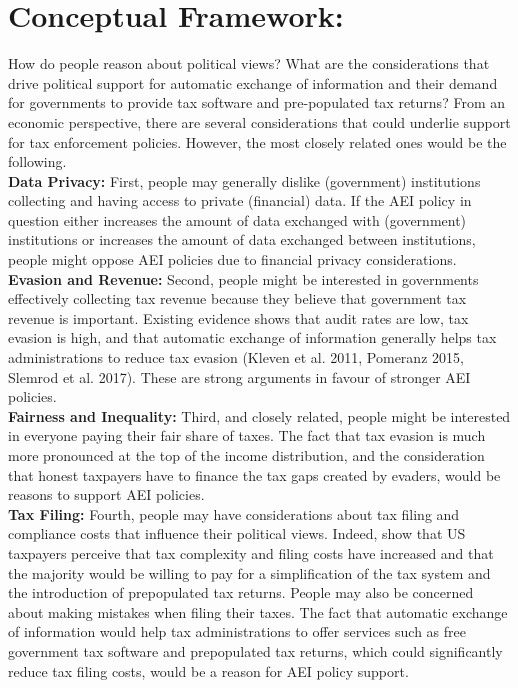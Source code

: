 \documentclass[11pt]{article}
\begin{document}
\section{Conceptual Framework:} How do people reason about political views? What are the considerations that drive political support for automatic exchange of information and their demand for governments to provide tax software and pre-populated tax returns? From an economic perspective, there are several considerations that could underlie support for tax enforcement policies. However, the most closely related ones would be the following. \\[0.5em]
\textbf{Data Privacy:} First, people may generally dislike (government) institutions collecting and having access to private (financial) data. If the AEI policy in question either increases the amount of data exchanged with (government) institutions or increases the amount of data exchanged between institutions, people might oppose AEI policies due to financial privacy considerations. \\[0.5em]
\textbf{Evasion and Revenue:} Second, people might be interested in governments effectively collecting tax revenue because they believe that government tax revenue is important. Existing evidence shows that audit rates are low, tax evasion is high, and that automatic exchange of information generally helps tax administrations to reduce tax evasion (Kleven et al. 2011, Pomeranz 2015, Slemrod et al. 2017). These are strong arguments in favour of stronger AEI policies. \\[0.5em]
\textbf{Fairness and Inequality:} Third, and closely related, people might be interested in everyone paying their fair share of taxes. The fact that tax evasion is much more pronounced at the top of the income distribution, and the consideration that honest taxpayers have to finance the tax gaps created by evaders, would be reasons to support AEI policies. \\[0.5em]
\textbf{Tax Filing:} Fourth, people may have considerations about tax filing and compliance costs that influence their political views. Indeed, \textcite{benzarti2024rising} show that US taxpayers perceive that tax complexity and filing costs have increased and that the majority would be willing to pay for a simplification of the tax system and the introduction of prepopulated tax returns. People may also be concerned about making mistakes when filing their taxes. The fact that automatic exchange of information would help tax administrations to offer services such as free government tax software and prepopulated tax returns, which could significantly reduce tax filing costs, would be a reason for AEI policy support. \\[0.5em]
\end{document}
